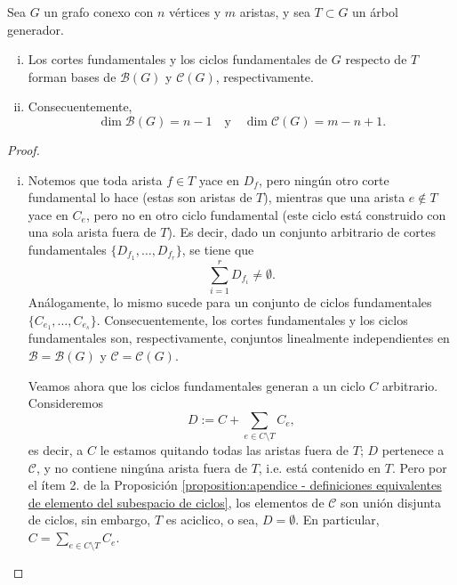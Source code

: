 \documentclass[../main.tex]{subfiles}
\begin{document}
\begin{theorem}
Sea $G$ un grafo conexo con $n$ vértices y $m$ aristas, y sea $T \subset G$ un árbol generador.
\begin{enumerate}[(i)]
\item Los cortes fundamentales y los ciclos fundamentales de $G$ respecto de $T$ forman bases de $\mathcal{B}(G)$ y $\mathcal{C}(G)$, respectivamente.
\item Consecuentemente,
$$
\dim \mathcal{B}(G) = n-1 \quad \text{y} \quad \dim \mathcal{C}(G) = m - n + 1.
$$
\end{enumerate}
\end{theorem}
\begin{proof}
\begin{enumerate}[(i)]
\item Notemos que toda arista $f \in T$ yace en $D_f$, pero ningún otro corte fundamental lo hace (estas son aristas de $T$), mientras que una arista $e \not \in T$ yace en $C_e$, pero no en otro ciclo fundamental (este ciclo está construido con una sola arista fuera de $T$).
Es decir, dado un conjunto arbitrario de cortes fundamentales $\{ D_{f_1}, \ldots, D_{f_r}\}$, se tiene que
$$
\sum_{i = 1}^r D_{f_i} \neq \emptyset.
$$
Análogamente, lo mismo sucede para un conjunto de ciclos fundamentales $\{ C_{e_1}, \ldots, C_{e_s} \}$.
Consecuentemente, los cortes fundamentales y los ciclos fundamentales son, respectivamente, conjuntos linealmente independientes en $\mathcal B = \mathcal B (G)$ y $\mathcal C  = \mathcal C (G)$.

Veamos ahora que los ciclos fundamentales generan a un ciclo $C$ arbitrario. Consideremos
$$
D := C + \sum_{e \in C \setminus T} C_e,
$$
es decir, a $C$ le estamos quitando todas las aristas fuera de $T$; $D$ pertenece a $\mathcal C$, y no contiene ningúna arista fuera de $T$, i.e. está contenido en $T$. Pero por el ítem 2. de la Proposición \ref{proposition:apendice - definiciones equivalentes de elemento del subespacio de ciclos}, los elementos de $\mathcal C$ son unión disjunta de ciclos, sin embargo, $T$ es aciclico, o sea, $D = \emptyset$. En particular, $C = \sum_{e \in C \setminus T} C_e$.


\end{enumerate}
\end{proof}
\end{document}
